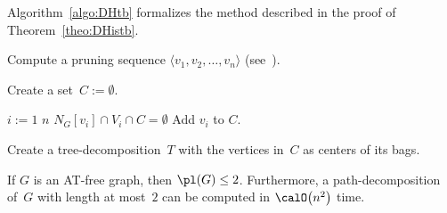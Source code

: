 Algorithm~\ref{algo:DHtb} formalizes the method described in the proof of Theorem~\ref{theo:DHistb}.

\begin{algorithm}
    [htb]
    \caption
    {%
        Computes, for a given distance-hereditary graph~$G$, a tree-decomposition~$T$ with strong breadth~$1$.
    }
    \label{algo:DHtb}

Compute a pruning sequence $\langle v_1, v_2, \ldots, v_n \rangle$ (see~\cite{DamiHabiPaul2001}).

Create a set~$C := \emptyset$.

\For
{%
    \( i := 1 \) \KwTo \( n \)
}
{%
    \If
    {%
        \( N_G[v_i] \cap V_i \cap C = \emptyset \)
    }
    {%
        Add $v_i$ to $C$.
    }
}

Create a tree-decomposition~$T$ with the vertices in~$C$ as centers of its bags.

\end{algorithm}

\begin{theorem}
    \label{theo:pbATfree}
If \( G \) is an AT-free graph, then \( \pl(G) \leq 2 \).
Furthermore, a path-decomposition of~\( G \) with length at most~\( 2 \) can be computed in \( \calO \big( n^2 \big) \) time.
\end{theorem}


